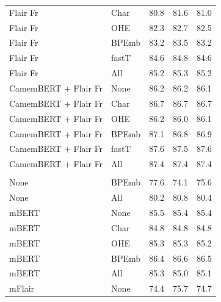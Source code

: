 \documentclass[12pt,a4paper,]{book}
\begin{document}
\begin{longtable}[t]{llrrr}
\hspace{1em}Flair Fr & Char & 80.8 & 81.6 & 81.0\\
\hspace{1em}Flair Fr & OHE & 82.3 & 82.7 & 82.5\\
\hspace{1em}Flair Fr & BPEmb & 83.2 & 83.5 & 83.2\\
\hspace{1em}Flair Fr & fastT & 84.6 & 84.8 & 84.6\\
\hspace{1em}Flair Fr & All & 85.2 & 85.3 & 85.2\\
\hspace{1em}CamemBERT + Flair Fr & None & 86.2 & 86.2 & 86.1\\
\hspace{1em}CamemBERT + Flair Fr & Char & 86.7 & 86.7 & 86.7\\
\hspace{1em}CamemBERT + Flair Fr & OHE & 86.2 & 86.0 & 86.1\\
\hspace{1em}CamemBERT + Flair Fr & BPEmb & 87.1 & 86.8 & 86.9\\
\hspace{1em}CamemBERT + Flair Fr & fastT & 87.6 & 87.5 & 87.6\\
\hspace{1em}CamemBERT + Flair Fr & All & 87.4 & 87.4 & 87.4\\
\addlinespace[0.3em]
\multicolumn{5}{l}{\textbf{Multilingual embeddings}}\\
\hspace{1em}None & BPEmb & 77.6 & 74.1 & 75.6\\
\hspace{1em}None & All & 80.2 & 80.8 & 80.4\\
\hspace{1em}mBERT & None & 85.5 & 85.4 & 85.4\\
\hspace{1em}mBERT & Char & 84.8 & 84.8 & 84.8\\
\hspace{1em}mBERT & OHE & 85.3 & 85.3 & 85.2\\
\hspace{1em}mBERT & BPEmb & 86.4 & 86.6 & 86.5\\
\hspace{1em}mBERT & All & 85.3 & 85.0 & 85.1\\
\hspace{1em}mFlair & None & 74.4 & 75.7 & 74.7\\

\end{longtable}
\end{document}
